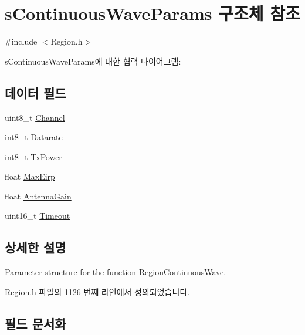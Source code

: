 \hypertarget{structs_continuous_wave_params}{}\section{s\+Continuous\+Wave\+Params 구조체 참조}
\label{structs_continuous_wave_params}


{\ttfamily \#include $<$Region.\+h$>$}



s\+Continuous\+Wave\+Params에 대한 협력 다이어그램\+:
\subsection*{데이터 필드}
\begin{DoxyCompactItemize}
\item 
uint8\+\_\+t \mbox{\hyperlink{structs_continuous_wave_params_a1ca6f01ca18afe402de51babe8c95f5e}{Channel}}
\item 
int8\+\_\+t \mbox{\hyperlink{structs_continuous_wave_params_ae2f6080f3aa0e9485c55513ca56bb24d}{Datarate}}
\item 
int8\+\_\+t \mbox{\hyperlink{structs_continuous_wave_params_a037b4f849fa8ed4aa1d3c58aef2b28ec}{Tx\+Power}}
\item 
float \mbox{\hyperlink{structs_continuous_wave_params_abacf3c28f803460c8947f0b0077fcf5c}{Max\+Eirp}}
\item 
float \mbox{\hyperlink{structs_continuous_wave_params_a727eaefd87f898a5238118573968962c}{Antenna\+Gain}}
\item 
uint16\+\_\+t \mbox{\hyperlink{structs_continuous_wave_params_ae1c58f120c7eef7bb71a5e3bfeaeb795}{Timeout}}
\end{DoxyCompactItemize}


\subsection{상세한 설명}
Parameter structure for the function Region\+Continuous\+Wave. 

Region.\+h 파일의 1126 번째 라인에서 정의되었습니다.



\subsection{필드 문서화}
\mbox{\label{structs_continuous_wave_params_a727eaefd87f898a5238118573968962c}} 

